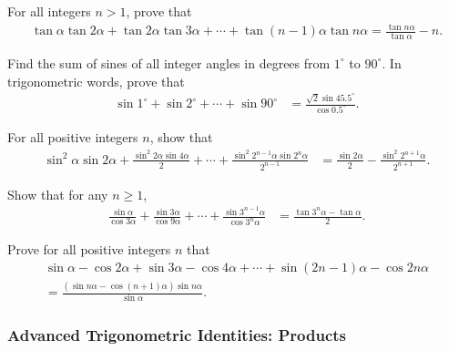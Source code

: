 \documentclass[12pt,a4paper]{memoir}
\theoremstyle{definition}
\begin{document}
\begin{question}
	For all integers $n>1$, prove that
	\begin{align*}
		\tan \alpha\tan2\alpha + \tan 2\alpha\tan 3\alpha + \cdots + \tan (n-1)\alpha\tan n\alpha = \frac{\tan n\alpha}{\tan \alpha} - n. 
	\end{align*}
\end{question}

\begin{question}
	Find the sum of sines of all integer angles in degrees from $1^\circ$ to $90^\circ$. In trigonometric words, prove that
	\begin{align*}
		\sin 1^{\circ} + \sin 2^{\circ} + \cdots + \sin 90^{\circ} &= \frac{\sqrt{2}\sin{45.5^{\circ}}}{\cos{0.5^{\circ}}}.
	\end{align*}
\end{question}

\begin{question}
	For all positive integers $n$, show that
	\begin{align*}
		\sin^2\alpha \sin 2\alpha + \frac{\sin^2 2\alpha \sin 4\alpha}{2} + \cdots + \frac{\sin^2 2^{n-1}\alpha\sin 2^n\alpha}{2^{n-1}} &= \frac{\sin 2\alpha}{2} - \frac{\sin^2 2^{n+1}\alpha}{2^{n+1}}.
	\end{align*}
\end{question}


\begin{question}
	Show that for any $n\geq 1$,
	\begin{align*}
		\frac{\sin \alpha}{\cos 3\alpha} + \frac{\sin 3\alpha}{\cos 9\alpha} + \cdots + \frac{\sin 3^{n-1}\alpha}{\cos 3^n\alpha} &= \frac{\tan 3^n\alpha - \tan \alpha}{2}. 
	\end{align*}
\end{question}



\begin{question}
	Prove for all positive integers $n$ that
	\begin{multline*}
		\sin \alpha - \cos 2\alpha + \sin 3\alpha - \cos 4\alpha +\cdots + \sin (2n-1)\alpha - \cos 2n\alpha \\ = \frac{\left(\sin n\alpha -\cos (n+1)\alpha\right)\sin n\alpha}{\sin \alpha}.
	\end{multline*}
\end{question}


\subsubsection{Advanced Trigonometric Identities: Products}
\end{document}
